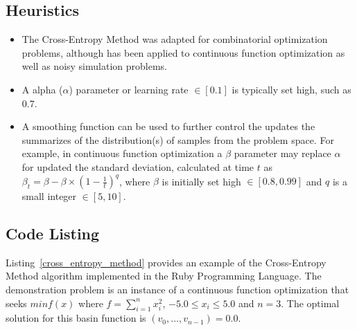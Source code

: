 \subsection{Heuristics}
\begin{itemize}
	\item The Cross-Entropy Method was adapted for combinatorial optimization problems, although has been applied to continuous function optimization as well as noisy simulation problems.
	\item A alpha ($\alpha$) parameter or learning rate $\in [0.1]$ is typically set high, such as 0.7.
	\item A smoothing function can be used to further control the updates the summarizes of the distribution(s) of samples from the problem space. For example, in continuous function optimization a $\beta$ parameter may replace $\alpha$ for updated the standard deviation, calculated at time $t$ as $\beta_{t} = \beta - \beta \times (1-\frac{1}{t})^q$, where $\beta$ is initially set high $\in [0.8, 0.99]$ and $q$ is a small integer $\in [5, 10]$.
\end{itemize}

\subsection{Code Listing}
Listing~\ref{cross_entropy_method} provides an example of the Cross-Entropy Method algorithm implemented in the Ruby Programming Language. 
The demonstration problem is an instance of a continuous function optimization that seeks $min f(x)$ where $f=\sum_{i=1}^n x_{i}^2$, $-5.0\leq x_i \leq 5.0$ and $n=3$. The optimal solution for this basin function is $(v_0,\ldots,v_{n-1})=0.0$.

